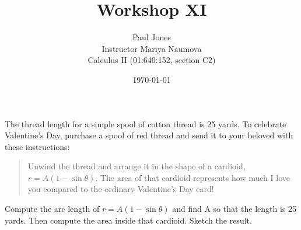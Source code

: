 \documentclass[11pt]{article}
\title{Workshop XI}
\author{Paul Jones \\
		Instructor Mariya Naumova\\
		Calculus II (01:640:152, section C2)}
\date{\today}
\begin{document}
\maketitle

\pagebreak

The thread length for a simple spool of cotton thread is 25 yards.
To celebrate Valentine's Day, purchase a spool of red thread and send it to your beloved with these instructions:

\begin{quotation}
Unwind the thread and arrange it in the shape of a cardioid, $r = A(1 - \sin\theta)$.
The area of that cardioid represents how much I love you compared to the ordinary Valentine's Day card!
\end{quotation}

Compute the arc length of $r = A(1 - \sin\theta)$ and find A so that the length is 25 yards. 
Then compute the area inside that cardioid. Sketch the result.
\end{document}
